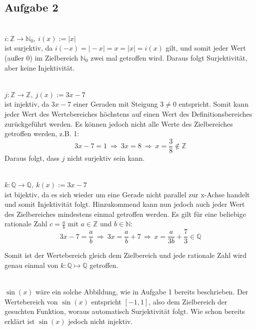 \documentclass[a4paper,graphics,11pt]{article}
\newcommand\aufgabe[1]{\subsection*{Aufgabe #1}}
\begin{document}
\aufgabe{2}
\begin{tasks}
    \task\\
        $i \colon \mathbb{Z} \rightarrow \mathbb{N}_{0},\ i(x) := \vert x\vert$\\
        ist surjektiv, da $i(-x) = \vert-x\vert = x = \vert x\vert = i(x)$ gilt,
        und somit jeder Wert (außer 0) im Zielbereich $\mathbb{N}_{0}$ zwei mal getroffen wird.
        Daraus folgt Surjektivität, aber keine Injektivität.

    \task\\
        $j \colon \mathbb{Z} \rightarrow \mathbb{Z},\ j(x) := 3x-7$\\ 
        ist injektiv, da $3x-7$ einer Geraden mit Steigung $3 \neq 0$ entspricht. Somit kann jeder Wert des Wertebereiches höchstens
        auf einen Wert des Definitionsbereiches zurückgeführt werden.
        Es können jedoch nicht alle Werte des Zielbereiches getroffen werden,
        z.B. 1: $$3x-7=1 \ \Longrightarrow\ 3x=8 \ \Longrightarrow\ x=\frac{3}{8}\notin \mathbb{Z}$$
        Daraus folgt, dass $j$ nicht surjektiv sein kann.

    \task\\
        $k \colon \mathbb{Q} \rightarrow \mathbb{Q},\ k(x) := 3x-7$\\ 
        ist bijektiv, da es sich wieder um eine Gerade nicht parallel zur x-Achse handelt
        und somit Injektivität folgt. Hinzukommend kann nun jedoch auch jeder Wert
        des Zielbereiches mindestens einmal getroffen werden. Es gilt für eine beliebige
        rationale Zahl $c=\frac{a}{b}$ mit $a \in \mathbb{Z}$ und $b \in \mathbb{N}$:
        $$3x-7 = \frac{a}{b} \ \Longrightarrow\ 3x=\frac{a}{b}+7 \,\Longrightarrow\, x=\frac{a}{3b} + \frac{7}{3} \in \mathbb{Q}$$
   
        Somit ist der Wertebereich gleich dem Zielbereich und jede rationale Zahl
        wird genau einmal von $k \colon \mathbb{Q} \mapsto \mathbb{Q}$ getroffen.

    \task\\
        $\sin(x)$ wäre ein solche Abbildung, wie in Aufgabe 1 bereits beschrieben.
        Der Wertebereich von $\sin(x)$ entspricht $[-1,1]$, also dem Zielbereich der
        gesuchten Funktion, woraus automatisch Surjektivität folgt.
        Wie schon bereits erklärt ist $\sin(x)$ jedoch nicht injektiv.
\end{tasks}
\end{document}
